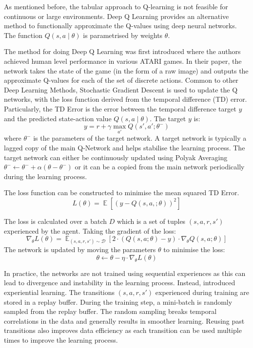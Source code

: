 \documentclass[11pt,a4paper]{report}
\DeclareMathOperator{\EX}{\mathbb{E}}
\begin{document}
As mentioned before, the tabular approach to Q-learning is not feasible for continuous or large environments. Deep Q Learning provides an alternative method to functionally approximate the Q-values using deep neural networks. The function $Q(s, a \mid \theta)$ is parametrised by weights $\theta$. 
\par
The method for doing Deep Q Learning was first introduced \cite{Mnih2015} where the authors achieved human level performance in various ATARI games. In their paper, the network takes the state of the game (in the form of a raw image) and outputs the approximate Q-values for each of the set of discrete actions. Common to other Deep Learning Methods, Stochastic Gradient Descent is used to update the Q networks, with the loss function derived from the temporal difference (TD) error. Particularly, the TD Error is the error between the temporal difference target $y$ and the predicted state-action value $Q(s,a \mid \theta)$. The target $y$ is:
\[
  y = r + \gamma \max_{a'} Q(s', a'; \theta^-)
\]
where $\theta^-$ is the parameters of the target network. A target network is typically a lagged copy of the main Q-Network and helps stabilise the learning process. The target network can either be continuously updated using Polyak Averaging $\theta^- \leftarrow \theta^-+ \alpha (\theta - \theta^-)$ or it can be a copied from the main network periodically during the learning process. 
\par 
The loss function can be constructed to minimise the mean squared TD Error. 
\[
  L(\theta) = \EX[(y - Q(s, a, ; \theta))^2]
\] 
\par 

The loss is calculated over a batch $D$ which is a set of tuples $(s, a, r, s')$ experienced by the agent. Taking the gradient of the loss:
\[
\nabla_{\theta} L(\theta) = \EX_{(s, a, r, s') \sim \mathcal{D}} [ 2 \cdot \left( Q(s, a; \theta) - y \right) \cdot \nabla_{\theta} Q(s, a; \theta) ]
\]
The network is updated by moving the parameters $\theta$ to minimise the loss:
\[
  \theta \leftarrow \theta - \eta \cdot \nabla_{\theta} L(\theta)
\] 
\par 
In practice, the networks are not trained using sequential experiences as this can lead to divergence and instability in the learning process. Instead, \cite{Mnih2015} introduced experiential learning. The transitions $(s, a, r, s')$ experienced during training are stored in a replay buffer. During the training step, a mini-batch is randomly sampled from the replay buffer. The random sampling breaks temporal correlations in the data and generally results in smoother learning. Reusing past transitions also improves data efficiency as each transition can be used multiple times to improve the learning process. 
\end{document}
